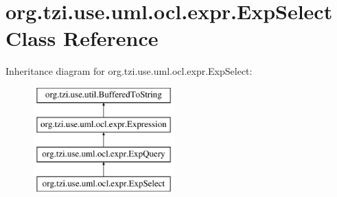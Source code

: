 \hypertarget{classorg_1_1tzi_1_1use_1_1uml_1_1ocl_1_1expr_1_1_exp_select}{\section{org.\-tzi.\-use.\-uml.\-ocl.\-expr.\-Exp\-Select Class Reference}
\label{classorg_1_1tzi_1_1use_1_1uml_1_1ocl_1_1expr_1_1_exp_select}
}
Inheritance diagram for org.\-tzi.\-use.\-uml.\-ocl.\-expr.\-Exp\-Select\-:\begin{figure}[H]
\begin{center}
\leavevmode
\includegraphics[height=4.000000cm]{classorg_1_1tzi_1_1use_1_1uml_1_1ocl_1_1expr_1_1_exp_select}
\end{center}
\end{figure}
